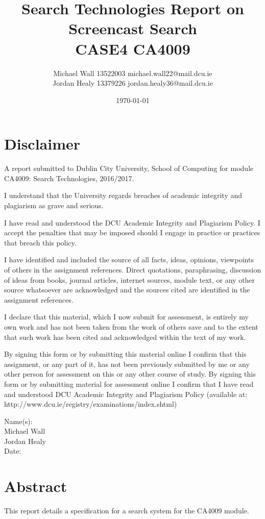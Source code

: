 \documentclass[a4paper,12pt]{article}
\title{Search Technologies Report on Screencast Search\\CASE4 CA4009}
\author{Michael Wall 13522003 michael.wall22@mail.dcu.ie\\Jordan Healy 13379226 jordan.healy36@mail.dcu.ie}
\date{\today}
\begin{document}
\maketitle
\newpage

\tableofcontents

\newpage

\section{Disclaimer}
A report submitted to Dublin City University, School of Computing for module CA4009: Search Technologies, 2016/2017.

I understand that the University regards breaches of academic integrity and plagiarism as grave and serious.

I have read and understood the DCU Academic Integrity and Plagiarism Policy. I accept the penalties that may be imposed should I engage in practice or practices that breach this policy.

I have identified and included the source of all facts, ideas, opinions, viewpoints of others in the assignment references. Direct quotations, paraphrasing, discussion of ideas from books, journal articles, internet sources, module text, or any other source whatsoever are acknowledged and the sources cited are identified in the assignment references.

I declare that this material, which I now submit for assessment, is entirely my own work and has not been taken from the work of others save and to the extent that such work has been cited and acknowledged within the text of my work.

By signing this form or by submitting this material online I confirm that this assignment, or any part of it, has not been previously submitted by me or any other person for assessment on this or any other course of study. By signing this form or by submitting material for assessment online I confirm that I have read and understood DCU Academic Integrity and Plagiarism Policy (available at: http://www.dcu.ie/registry/examinations/index.shtml)

Name(s): \\Michael Wall\\Jordan Healy\\

Date:

\newpage

\section{Abstract}
This report details a specification for a search system for the CA4009 module.
\end{document}
